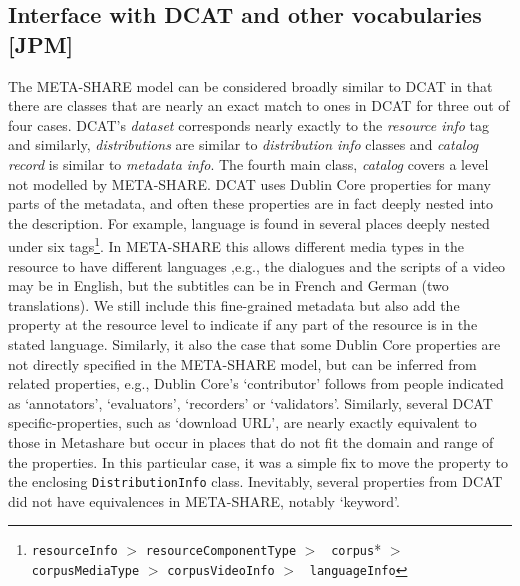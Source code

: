 \documentclass{llncs}
\begin{document}
{\subsection{Interface with DCAT and other vocabularies [JPM]}
\label{sec:dcat}
The META-SHARE model can be considered broadly similar to DCAT in that there are
classes that are nearly an exact match to ones in DCAT for three out of four
cases. DCAT's \emph{dataset} corresponds nearly exactly to the \emph{resource
info} tag and similarly, \emph{distributions} are similar to \emph{distribution
info} classes and \emph{catalog record} is similar to \emph{metadata info}. The
fourth main class, \emph{catalog} covers a level not modelled by META-SHARE.
DCAT uses Dublin Core properties for many parts of the metadata, and often these
properties are in fact deeply nested into the description. For example, language
is found in several places deeply nested under six
tags\footnote{{\tt resourceInfo} $>$ {\tt resourceComponentType} $>$ {\tt
corpus}* $>$ {\tt corpusMediaType} $>$ {\tt corpusVideoInfo} $>$ {\tt
languageInfo}}. In META-SHARE this allows different media types in the resource
to have different languages ,e.g., the dialogues and the scripts of a video may
be in English, but the subtitles can be in French and German (two translations).
We still include this fine-grained metadata but also add the property at the resource level
to indicate if any part of the resource is in the stated language.
Similarly, it also the case that some Dublin Core properties are not directly
specified in the META-SHARE model, but can be inferred from related properties,
e.g., Dublin Core's `contributor' follows from people indicated as `annotators',
`evaluators', `recorders' or `validators'. Similarly, several DCAT specific-properties, such as `download URL', are nearly
exactly equivalent to those in Metashare but occur in places that do not fit the
domain and range of the properties. In this particular case, it was a simple fix
to move the property to the enclosing {\tt DistributionInfo} class.
Inevitably, several properties from DCAT did not have equivalences in
META-SHARE, notably `keyword'.

}
\end{document}
